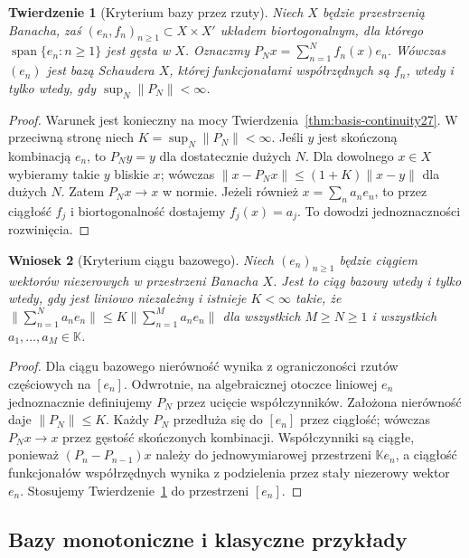 \documentclass[11pt,a4paper]{article}
\numberwithin{equation}{section}
\theoremstyle{plain}
\newtheorem{twierdzenie}{Twierdzenie}[section]
\newtheorem{wniosek}[twierdzenie]{Wniosek}
\theoremstyle{definition}
\theoremstyle{remark}
\newcommand{\K}{\mathbb K}
\begin{document}
\begin{twierdzenie}[Kryterium bazy przez rzuty]
\label{thm:biorthogonal-criterion27}
Niech $X$ będzie przestrzenią Banacha, zaś
$(e_n,f_n)_{n\ge1}\subset X\times X'$ układem biortogonalnym,
dla którego $\operatorname{span}\{e_n:n\ge1\}$ jest gęsta w $X$.
Oznaczmy $P_Nx=\sum_{n=1}^Nf_n(x)e_n$.
Wówczas $(e_n)$ jest bazą Schaudera $X$, której
funkcjonałami współrzędnych są $f_n$, wtedy i tylko wtedy,
gdy $\sup_N\|P_N\|<\infty$.
\end{twierdzenie}
\begin{proof}
Warunek jest konieczny na mocy
Twierdzenia~\ref{thm:basis-continuity27}.
W przeciwną stronę niech $K=\sup_N\|P_N\|<\infty$.
Jeśli $y$ jest skończoną kombinacją $e_n$, to $P_Ny=y$
dla dostatecznie dużych $N$. Dla dowolnego $x\in X$
wybieramy takie $y$ bliskie $x$; wówczas
$\|x-P_Nx\|\le(1+K)\|x-y\|$ dla dużych $N$.
Zatem $P_Nx\to x$ w normie.
Jeżeli również $x=\sum_na_ne_n$, to przez ciągłość $f_j$
i biortogonalność dostajemy $f_j(x)=a_j$.
To dowodzi jednoznaczności rozwinięcia.
\end{proof}

\begin{wniosek}[Kryterium ciągu bazowego]
\label{cor:basic-sequence27}
Niech $(e_n)_{n\ge1}$ będzie ciągiem wektorów niezerowych
w przestrzeni Banacha $X$. Jest to ciąg bazowy wtedy i tylko wtedy,
gdy jest liniowo niezależny i istnieje $K<\infty$ takie, że
$\|\sum_{n=1}^Na_ne_n\|
\le K\|\sum_{n=1}^Ma_ne_n\|$
dla wszystkich $M\ge N\ge1$ i wszystkich $a_1,\ldots,a_M\in\K$.
\end{wniosek}
\begin{proof}
Dla ciągu bazowego nierówność wynika z ograniczoności
rzutów częściowych na $[e_n]$.
Odwrotnie, na algebraicznej otoczce liniowej $e_n$
jednoznacznie definiujemy $P_N$ przez ucięcie współczynników.
Założona nierówność daje $\|P_N\|\le K$.
Każdy $P_N$ przedłuża się do $[e_n]$ przez ciągłość;
wówczas $P_Nx\to x$ przez gęstość skończonych kombinacji.
Współczynniki są ciągłe, ponieważ
$(P_n-P_{n-1})x$ należy do jednowymiarowej przestrzeni
$\K e_n$, a ciągłość funkcjonałów współrzędnych
wynika z podzielenia przez stały niezerowy wektor $e_n$.
Stosujemy Twierdzenie~\ref{thm:biorthogonal-criterion27}
do przestrzeni $[e_n]$.
\end{proof}

\subsection{Bazy monotoniczne i klasyczne przykłady}
\end{document}
